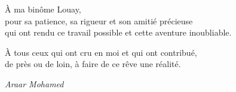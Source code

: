 \begin{center}
\begin{minipage}{0.9\textwidth}
\vspace{0.1cm}

À ma binôme Louay,\\
pour sa patience, sa rigueur et son amitié précieuse\\
qui ont rendu ce travail possible et cette aventure inoubliable.\\

\vspace{0.1cm}

À tous ceux qui ont cru en moi et qui ont contribué,\\
de près ou de loin, à faire de ce rêve une réalité.

\end{minipage}
\end{center}

\vspace{0.3cm}

\begin{flushright}
\textit{Araar Mohamed}
\end{flushright}

\newpage

